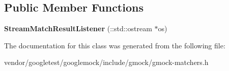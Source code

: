 \subsection*{Public Member Functions}
\begin{DoxyCompactItemize}
\item 
{\bfseries Stream\+Match\+Result\+Listener} (\+::std\+::ostream $\ast$os)\hypertarget{classtesting_1_1internal_1_1StreamMatchResultListener_a81985760741d818745237df002d65d04}{}\label{classtesting_1_1internal_1_1StreamMatchResultListener_a81985760741d818745237df002d65d04}

\end{DoxyCompactItemize}


The documentation for this class was generated from the following file\+:\begin{DoxyCompactItemize}
\item 
vendor/googletest/googlemock/include/gmock/gmock-\/matchers.\+h\end{DoxyCompactItemize}
